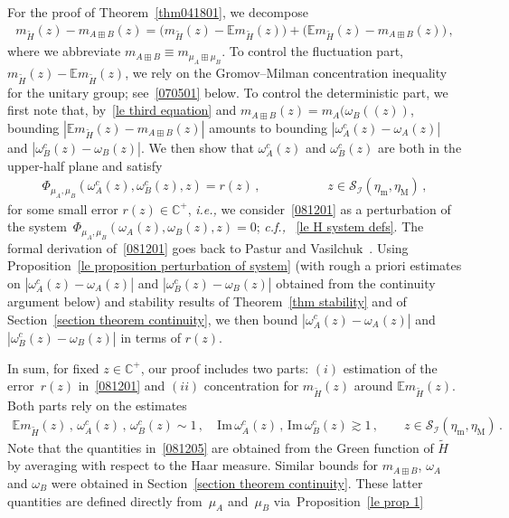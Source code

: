 \documentclass[10pt,reqno]{amsart}
\numberwithin{equation}{section}
\theoremstyle{plain}
\numberwithin{kevin}{section}
\theoremstyle{remark}
\renewcommand{\Im}{\mathrm{Im}\,}
\newcommand{\C}{{\mathbb C}}
\newcommand{\ie}{\emph{i.e., }}
\newcommand{\cf}{\emph{c.f., }}
\newcommand{\PP}{\Phi}
\begin{document}
For the proof of Theorem~\ref{thm041801}, we decompose
\begin{eqnarray}
m_{\widetilde H}(z)-m_{A\boxplus B}(z)=\big(m_{\widetilde H}(z)-\mathbb{E}m_{\widetilde H}(z)\big)+\big(\mathbb{E}m_{\widetilde H}(z)-m_{A\boxplus B}(z)\big)\,, \label{071720}
\end{eqnarray}
where we abbreviate $m_{A \boxplus B}\equiv m_{\mu_{A}\boxplus\mu_{B}}$. To control the fluctuation part, $m_{\widetilde H}(z)-\mathbb{E}m_{\widetilde H}(z)$, we rely on the Gromov--Milman concentration inequality~\cite{GM83} for the unitary group; see~\eqref{070501} below. To control the deterministic part, we first note that, by~\eqref{le third equation} and $m_{A\boxplus B}(z)=m_{A}(\omega_B((z))$, bounding $|\mathbb{E}m_{\widetilde H}(z)-m_{A\boxplus B}(z)|$ amounts to bounding $|\omega_A^c(z)-\omega_A(z)|$ and $|\omega_B^c(z)-\omega_B(z)|$. We then show that $\omega_A^c(z)$ and $\omega_B^c(z)$ are both in the upper-half plane and satisfy
\begin{align}
\PP_{\mu_A,\mu_B}(\omega_A^c(z),\omega_B^c(z),z)=r(z)\,,\qquad\qquad\quad\; z\in \mathcal{S}_{\mathcal{I}}(\eta_{\mathrm{m}}, \eta_{\mathrm{M}})\,, \label{081201}
\end{align}
for some small error $r(z)\in\C^+$, \ie we consider~\eqref{081201} as a perturbation of the system~$
\PP_{\mu_A,\mu_B}(\omega_A(z),\omega_B(z),z)=0$; 
\cf~\eqref{le H system defs}.
 The formal derivation of~\eqref{081201} goes back to Pastur and Vasilchuk~\cite{VP}. Using Proposition~\ref{le proposition perturbation of system} (with rough a priori estimates on $|\omega_A^c(z)-\omega_A(z)|$ and $|\omega_B^c(z)-\omega_B(z)|$ obtained from the continuity argument below) and stability results of Theorem~\ref{thm stability} and of Section~\ref{section theorem continuity}, we then bound $|\omega_A^c(z)-\omega_A(z)|$ and $|\omega_B^c(z)-\omega_B(z)|$ in terms of $r(z)$.
 
 
In sum, for fixed $z\in\C^+$, our proof includes two parts: $(i)$ estimation of the error~$r(z)$ in~\eqref{081201} and $(ii)$ concentration for $m_{\widetilde H}(z)$ around $\mathbb{E}m_{\widetilde H}(z)$. Both parts
rely on the estimates
\begin{align}
\mathbb{E}m_{\widetilde H}(z)\,,\, \omega_A^c(z)\,,\, \omega_B^c(z)\sim 1\,,\quad \Im\omega^c_A(z)\,,\, \Im \omega^c_B(z)\gtrsim 1\,,\qquad z\in \mathcal{S}_{\mathcal{I}}(\eta_{\mathrm{m}}, \eta_{\mathrm{M}})\,. \label{081205}
\end{align}
Note that the quantities in~\eqref{081205} are obtained from the Green function of ${\widetilde H}$ by averaging with respect to the Haar measure. Similar bounds for $m_{A\boxplus B}$, $\omega_A$ and $\omega_B$ were obtained in Section~\ref{section theorem continuity}. These latter quantities are defined directly from~$\mu_A$ and~$\mu_B$ via~Proposition~\ref{le prop 1}  
\end{document}

